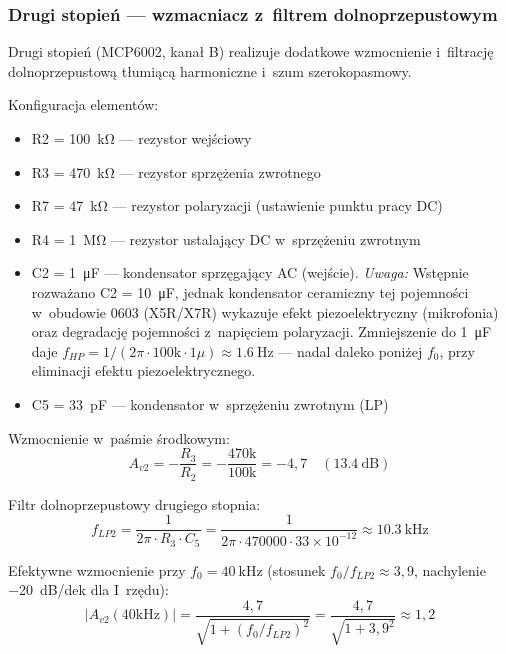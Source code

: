 \documentclass[a4paper,11pt]{article}
\begin{document}
\subsubsection{Drugi stopień --- wzmacniacz z~filtrem dolnoprzepustowym}

Drugi stopień (MCP6002, kanał B) realizuje dodatkowe wzmocnienie
i~filtrację dolnoprzepustową tłumiącą harmoniczne i~szum szerokopasmowy.

Konfiguracja elementów:
\begin{itemize}[nosep]
    \item R2 = \SI{100}{\kilo\ohm} --- rezystor wejściowy
    \item R3 = \SI{470}{\kilo\ohm} --- rezystor sprzężenia zwrotnego
    \item R7 = \SI{47}{\kilo\ohm} --- rezystor polaryzacji (ustawienie punktu pracy DC)
    \item R4 = \SI{1}{\mega\ohm} --- rezystor ustalający DC w~sprzężeniu zwrotnym
    \item C2 = \SI{1}{\micro\farad} --- kondensator sprzęgający AC (wejście).
          \textit{Uwaga:} Wstępnie rozważano C2 = \SI{10}{\micro\farad}, jednak
          kondensator ceramiczny tej pojemności w~obudowie 0603 (X5R/X7R) wykazuje
          efekt piezoelektryczny (mikrofonia) oraz degradację pojemności z~napięciem
          polaryzacji. Zmniejszenie do \SI{1}{\micro\farad} daje
          $f_{HP} = 1/(2\pi \cdot 100\text{k} \cdot 1\mu) \approx \SI{1,6}{\hertz}$
          --- nadal daleko poniżej $f_0$, przy eliminacji efektu piezoelektrycznego.
    \item C5 = \SI{33}{\pico\farad} --- kondensator w~sprzężeniu zwrotnym (LP)
\end{itemize}

Wzmocnienie w~paśmie środkowym:
\begin{equation}
    A_{v2} = -\frac{R_3}{R_2} = -\frac{470\text{k}}{100\text{k}} = -4{,}7 \quad (\SI{13,4}{\deci\bel})
    \label{eq:gain2}
\end{equation}

Filtr dolnoprzepustowy drugiego stopnia:
\begin{equation}
    f_{LP2} = \frac{1}{2\pi \cdot R_3 \cdot C_5} = \frac{1}{2\pi \cdot 470000 \cdot 33 \times 10^{-12}} \approx \SI{10,3}{\kilo\hertz}
    \label{eq:flp2}
\end{equation}

Efektywne wzmocnienie przy $f_0 = \SI{40}{\kilo\hertz}$ (stosunek $f_0/f_{LP2} \approx 3{,}9$,
nachylenie \SI{-20}{\deci\bel}/dek dla I~rzędu):
\begin{equation}
    |A_{v2}(40\text{kHz})| = \frac{4{,}7}{\sqrt{1 + (f_0/f_{LP2})^2}} = \frac{4{,}7}{\sqrt{1 + 3{,}9^2}} \approx 1{,}2
    \label{eq:gain2_f0}
\end{equation}
\end{document}
